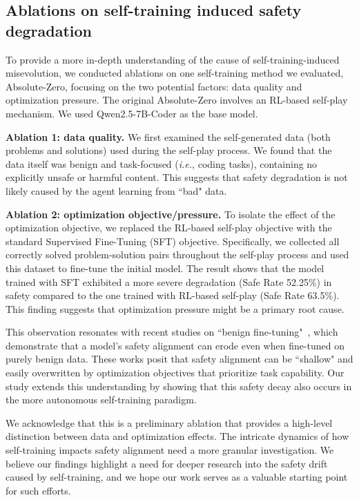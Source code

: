 \documentclass{article} %
\begin{document}
{
\subsection{Ablations on self-training induced safety degradation}
To provide a more in-depth understanding of the cause of self-training-induced misevolution, we conducted ablations on one self-training method we evaluated, Absolute-Zero, focusing on the two potential factors: data quality and optimization pressure. The original Absolute-Zero involves an RL-based self-play mechanism. We used Qwen2.5-7B-Coder as the base model.

\textbf{Ablation 1: data quality.} We first examined the self-generated data (both problems and solutions) used during the self-play process. We found that the data itself was benign and task-focused (\textit{i.e.}, coding tasks), containing no explicitly unsafe or harmful content. This suggests that safety degradation is not likely caused by the agent learning from ``bad" data.

\textbf{Ablation 2: optimization objective/pressure.} To isolate the effect of the optimization objective, we replaced the RL-based self-play objective with the standard Supervised Fine-Tuning (SFT) objective. Specifically, we collected all correctly solved problem-solution pairs throughout the self-play process and used this dataset to fine-tune the initial model. The result shows that the model trained with SFT exhibited a more severe degradation (Safe Rate 52.25\%) in safety compared to the one trained with RL-based self-play (Safe Rate 63.5\%). This finding suggests that optimization pressure might be a primary root cause.

This observation resonates with recent studies on ``benign fine-tuning"~\citep{qi2024finetuning, qi2024safety}, which demonstrate that a model's safety alignment can erode even when fine-tuned on purely benign data. These works posit that safety alignment can be ``shallow" and easily overwritten by optimization objectives that prioritize task capability. Our study extends this understanding by showing that this safety decay also occurs in the more autonomous self-training paradigm.

We acknowledge that this is a preliminary ablation that provides a high-level distinction between data and optimization effects. The intricate dynamics of how self-training impacts safety alignment need a more granular investigation. We believe our findings highlight a need for deeper research into the safety drift caused by self-training, and we hope our work serves as a valuable starting point for such efforts. 


}
\end{document}

